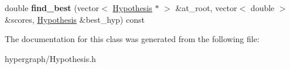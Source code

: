 \begin{DoxyCompactItemize}
\item 
\hypertarget{classScarab_1_1HG_1_1TrivialController_accb9880d602ece9bfb840ee2fbb4d684}{
double {\bfseries find\_\-best} (vector$<$ \hyperlink{structScarab_1_1HG_1_1Hypothesis}{Hypothesis} $\ast$ $>$ \&at\_\-root, vector$<$ double $>$ \&scores, \hyperlink{structScarab_1_1HG_1_1Hypothesis}{Hypothesis} \&best\_\-hyp) const }
\label{classScarab_1_1HG_1_1TrivialController_accb9880d602ece9bfb840ee2fbb4d684}

\end{DoxyCompactItemize}


The documentation for this class was generated from the following file:\begin{DoxyCompactItemize}
\item 
hypergraph/Hypothesis.h\end{DoxyCompactItemize}

